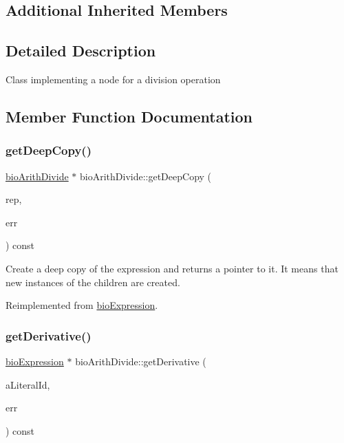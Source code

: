 \subsection*{Additional Inherited Members}


\subsection{Detailed Description}
Class implementing a node for a division operation 

\subsection{Member Function Documentation}
\mbox{\label{classbio_arith_divide_aa867fd8e74e654f419eee829a08e816c}} 
\subsubsection{\texorpdfstring{get\+Deep\+Copy()}{getDeepCopy()}}
{\footnotesize\ttfamily \hyperlink{classbio_arith_divide}{bio\+Arith\+Divide} $\ast$ bio\+Arith\+Divide\+::get\+Deep\+Copy (\begin{DoxyParamCaption}\item[{\hyperlink{classbio_expression_repository}{bio\+Expression\+Repository} $\ast$}]{rep,  }\item[{pat\+Error $\ast$\&}]{err }\end{DoxyParamCaption}) const\hspace{0.3cm}{\ttfamily [virtual]}}

Create a deep copy of the expression and returns a pointer to it. It means that new instances of the children are created. 

Reimplemented from \hyperlink{classbio_expression_a4ee1b8add634078a02eaae26cd40dcc8}{bio\+Expression}.

\mbox{\label{classbio_arith_divide_a9a30c3d5586f0bce3b09cc2c932e5f67}} 
\subsubsection{\texorpdfstring{get\+Derivative()}{getDerivative()}}
{\footnotesize\ttfamily \hyperlink{classbio_expression}{bio\+Expression} $\ast$ bio\+Arith\+Divide\+::get\+Derivative (\begin{DoxyParamCaption}\item[{pat\+U\+Long}]{a\+Literal\+Id,  }\item[{pat\+Error $\ast$\&}]{err }\end{DoxyParamCaption}) const\hspace{0.3cm}{\ttfamily [virtual]}}

